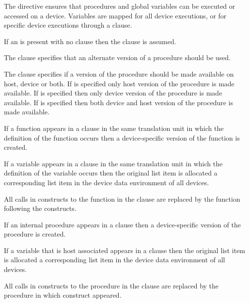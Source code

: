 \descr

The   directive ensures that procedures
and global variables can be executed or accessed on a device.
Variables are mapped for all device executions, or for specific
device executions through a  clause.

If an  is present with no clause then the 
clause is assumed.

The  clause specifies that an alternate version of a procedure should be
used.

The  clause specifies if a version of the procedure should be made
available on host, device or both. If  is specified only host version
of the procedure is made available.  If  is specified then only device
version of the procedure is made available.  If  is specified then both
device and host version of the procedure is made available.

\begin{ccppspecific}
If a function appears in a  clause in the same translation unit in which the definition of
the function occurs then a device-specific version of the function is created.

If a variable appears in a  clause in the same translation unit in which the definition
of the variable occurs then the original list item is allocated a corresponding
list item in the device data environment of all devices.

All calls in  constructs to the function in the  clause
are replaced by the function following the   constructs.
\end{ccppspecific}

\begin{fortranspecific}
If an internal procedure appears in a  clause
then a device-specific version of the procedure is created.

If a variable that is host associated appears in a  clause
then the original list item is allocated a corresponding list item in the
device data environment of all devices.



All calls in  constructs to the procedure in the 
clause are replaced by the procedure in which   construct appeared.
\end{fortranspecific}

